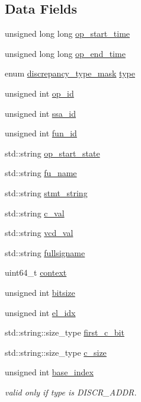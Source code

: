 \subsection*{Data Fields}
\begin{DoxyCompactItemize}
\item 
unsigned long long \hyperlink{structDiscrepancyLog_abb83d670a7944e9d23122a964941f18d}{op\+\_\+start\+\_\+time}
\item 
unsigned long long \hyperlink{structDiscrepancyLog_ab1fe07a76e338c6390fca37925845108}{op\+\_\+end\+\_\+time}
\item 
enum \hyperlink{DiscrepancyOpInfo_8hpp_ae95cd44b11919bdb0ddc5eb2dbe46e09}{discrepancy\+\_\+type\+\_\+mask} \hyperlink{structDiscrepancyLog_ada7ae5b0629194aa4c665d7d2212a606}{type}
\item 
unsigned int \hyperlink{structDiscrepancyLog_a511a73331084c98d262755f797763029}{op\+\_\+id}
\item 
unsigned int \hyperlink{structDiscrepancyLog_ae9ede71c651ff5631a5dc9e59e444e8a}{ssa\+\_\+id}
\item 
unsigned int \hyperlink{structDiscrepancyLog_a702e53525b84be4290e7c442ed1421ba}{fun\+\_\+id}
\item 
std\+::string \hyperlink{structDiscrepancyLog_a007a430ee2cbc198fe8c4323d7cdc368}{op\+\_\+start\+\_\+state}
\item 
std\+::string \hyperlink{structDiscrepancyLog_acdf435913892d9b8128df9c02bf1d0e6}{fu\+\_\+name}
\item 
std\+::string \hyperlink{structDiscrepancyLog_a011c5d8f95583bea19f9c516995bb81f}{stmt\+\_\+string}
\item 
std\+::string \hyperlink{structDiscrepancyLog_a10f4fa59b64ee5a9086708a4b7e3b84f}{c\+\_\+val}
\item 
std\+::string \hyperlink{structDiscrepancyLog_ad54b5f61d46983e9b273ed976f00de09}{vcd\+\_\+val}
\item 
std\+::string \hyperlink{structDiscrepancyLog_acf7b7677212c41f10c7dbe2cf0b5a015}{fullsigname}
\item 
uint64\+\_\+t \hyperlink{structDiscrepancyLog_a2f9c6172e9f7765a6c5a5786aca8d480}{context}
\item 
unsigned int \hyperlink{structDiscrepancyLog_a061e80dbb5e142ab31977e52c0e404ad}{bitsize}
\item 
unsigned int \hyperlink{structDiscrepancyLog_a44d4a9cc80f7f51095a518e842115927}{el\+\_\+idx}
\item 
std\+::string\+::size\+\_\+type \hyperlink{structDiscrepancyLog_a53d9c15b54df4d9076330436ca61b585}{first\+\_\+c\+\_\+bit}
\item 
std\+::string\+::size\+\_\+type \hyperlink{structDiscrepancyLog_a44fb0948f5b5039293a0330b2e36dffd}{c\+\_\+size}
\item 
unsigned int \hyperlink{structDiscrepancyLog_a4c9c822556d479b60dc9829249698fc9}{base\+\_\+index}
\begin{DoxyCompactList}\small\item\em valid only if type is D\+I\+S\+C\+R\+\_\+\+A\+D\+DR. \end{DoxyCompactList}\end{DoxyCompactItemize}



